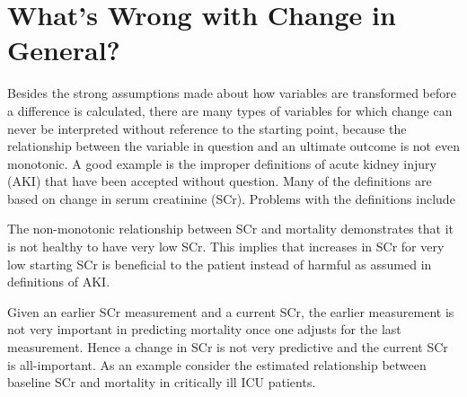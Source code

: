 \section{What's Wrong with Change in General?}
Besides the strong assumptions made about how variables are
transformed before a difference is calculated, there are many types of
variables for which change can never be interpreted without reference
to the starting point, because the relationship between the variable
in question and an ultimate outcome is not even monotonic.  A good
example is the improper definitions of acute kidney injury (AKI) that have
been accepted without question.  Many of the definitions are based on
change in serum creatinine (SCr).  Problems with the definitions include
\be
\item The non-monotonic relationship between SCr and mortality
  demonstrates that it is not healthy to have very low SCr.  This implies
  that increases in SCr for very low starting SCr is beneficial to the
  patient instead of harmful as assumed in definitions of AKI.
\item Given an earlier SCr measurement and a current SCr, the earlier
  measurement is not very important in predicting mortality once one
  adjusts for the last measurement.  Hence a change in SCr is not very
  predictive and the current SCr is all-important.
\ee
As an example consider the estimated relationship between baseline SCr
and mortality in critically ill ICU patients.
